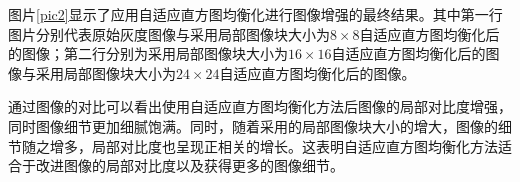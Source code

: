 \documentclass[conference]{IEEEtran}
\begin{document}
图片\ref{pic2}显示了应用自适应直方图均衡化进行图像增强的最终结果。其中第一行图片分别代表原始灰度图像与采用局部图像块大小为$8\times 8$自适应直方图均衡化后的图像；第二行分别为采用局部图像块大小为$16\times 16$自适应直方图均衡化后的图像与采用局部图像块大小为$24\times 24$自适应直方图均衡化后的图像。

通过图像的对比可以看出使用自适应直方图均衡化方法后图像的局部对比度增强，同时图像细节更加细腻饱满。同时，随着采用的局部图像块大小的增大，图像的细节随之增多，局部对比度也呈现正相关的增长。这表明自适应直方图均衡化方法适合于改进图像的局部对比度以及获得更多的图像细节。
\end{document}
